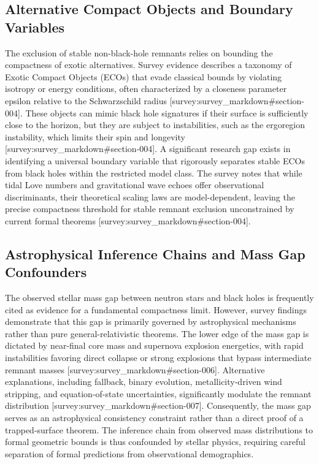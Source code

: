 \documentclass[conference]{IEEEtran}
\begin{document}
\subsection{Alternative Compact Objects and Boundary Variables}
The exclusion of stable non-black-hole remnants relies on bounding the compactness of exotic alternatives. Survey evidence describes a taxonomy of Exotic Compact Objects (ECOs) that evade classical bounds by violating isotropy or energy conditions, often characterized by a closeness parameter epsilon relative to the Schwarzschild radius [survey:survey\_markdown\#section-004]. These objects can mimic black hole signatures if their surface is sufficiently close to the horizon, but they are subject to instabilities, such as the ergoregion instability, which limits their spin and longevity [survey:survey\_markdown\#section-004]. A significant research gap exists in identifying a universal boundary variable that rigorously separates stable ECOs from black holes within the restricted model class. The survey notes that while tidal Love numbers and gravitational wave echoes offer observational discriminants, their theoretical scaling laws are model-dependent, leaving the precise compactness threshold for stable remnant exclusion unconstrained by current formal theorems [survey:survey\_markdown\#section-004].

\subsection{Astrophysical Inference Chains and Mass Gap Confounders}
The observed stellar mass gap between neutron stars and black holes is frequently cited as evidence for a fundamental compactness limit. However, survey findings demonstrate that this gap is primarily governed by astrophysical mechanisms rather than pure general-relativistic theorems. The lower edge of the mass gap is dictated by near-final core mass and supernova explosion energetics, with rapid instabilities favoring direct collapse or strong explosions that bypass intermediate remnant masses [survey:survey\_markdown\#section-006]. Alternative explanations, including fallback, binary evolution, metallicity-driven wind stripping, and equation-of-state uncertainties, significantly modulate the remnant distribution [survey:survey\_markdown\#section-007]. Consequently, the mass gap serves as an astrophysical consistency constraint rather than a direct proof of a trapped-surface theorem. The inference chain from observed mass distributions to formal geometric bounds is thus confounded by stellar physics, requiring careful separation of formal predictions from observational demographics.~\cite{cite_7a407c865faafd11}
\end{document}
